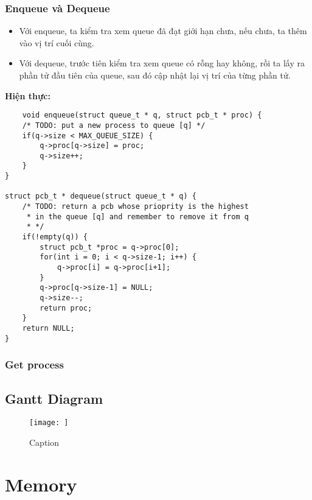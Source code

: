 \documentclass[10pt]{article}
\begin{document}
\subsubsection{Enqueue và Dequeue}
\begin{itemize}
    \item Với enqueue, ta kiểm tra xem queue đã đạt giới hạn chưa, nếu chưa, ta thêm vào vị trí cuối cùng.
    \item Với dequeue, trước tiên kiểm tra xem queue có rỗng hay không, rồi ta lấy ra phần tử đầu tiên của queue, sau đó cập nhật lại vị trí của từng phần tử.
\end{itemize}
\textbf{Hiện thực:}
\begin{lstlisting}
    void enqueue(struct queue_t * q, struct pcb_t * proc) {
	/* TODO: put a new process to queue [q] */	
	if(q->size < MAX_QUEUE_SIZE) {
		q->proc[q->size] = proc;
		q->size++;
	}
}

struct pcb_t * dequeue(struct queue_t * q) {
	/* TODO: return a pcb whose prioprity is the highest
	 * in the queue [q] and remember to remove it from q
	 * */
	if(!empty(q)) {
		struct pcb_t *proc = q->proc[0];
		for(int i = 0; i < q->size-1; i++) {
			q->proc[i] = q->proc[i+1];
		}
		q->proc[q->size-1] = NULL;
		q->size--;
		return proc;
	}
	return NULL;
}
\end{lstlisting}

\subsubsection{Get process}

\subsection{Gantt Diagram}
\begin{figure}
    \centering
    \texttt{[image: ]}
    \caption{Caption}
\end{figure}

\section{Memory}
\end{document}

